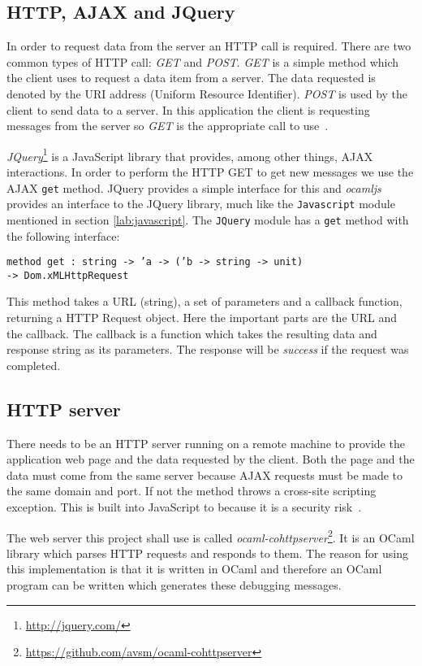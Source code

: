 \subsection{HTTP, AJAX and JQuery}
In order to request data from the server an HTTP call is required. There are two common types of HTTP call: \emph{GET} and \emph{POST}. \emph{GET} is a simple method which the client uses to request a data item from a server. The data requested is denoted by the URI address (Uniform Resource Identifier). \emph{POST} is used by the client to send data to a server. In this application the client is requesting messages from the server so \emph{GET} is the appropriate call to use~\cite{bib:http}.

\emph{JQuery}\footnote{\url{http://jquery.com/}} is a JavaScript library that provides, among other things, AJAX interactions. In order to perform the HTTP GET to get new messages we use the AJAX \texttt{get} method. JQuery provides a simple interface for this and \emph{ocamljs} provides an interface to the JQuery library, much like the \texttt{Javascript} module mentioned in section \ref{lab:javascript}. The \texttt{JQuery} module has a \texttt{get} method with the following interface:

\texttt{method get : string -> 'a -> ('b -> string -> unit)\\ -> Dom.xMLHttpRequest}

This method takes a URL (string), a set of parameters and a callback function, returning a HTTP Request object. Here the important parts are the URL and the callback. The callback is a function which takes the resulting data and response string as its parameters. The response will be \emph{success} if the request was completed.

\subsection{HTTP server}
There needs to be an HTTP server running on a remote machine to provide the application web page and the data requested by the client. Both the page and the data must come from the same server because AJAX requests must be made to the same domain and port. If not the method throws a cross-site scripting exception. This is built into JavaScript to because it is a security risk~\cite{bib:xss}.\label{lab:xss}

The web server this project shall use is called \emph{ocaml-cohttpserver}\footnote{\url{https://github.com/avsm/ocaml-cohttpserver}}. It is an OCaml library which parses HTTP requests and responds to them. The reason for using this implementation is that it is written in OCaml and therefore an OCaml program can be written which generates these debugging messages.

